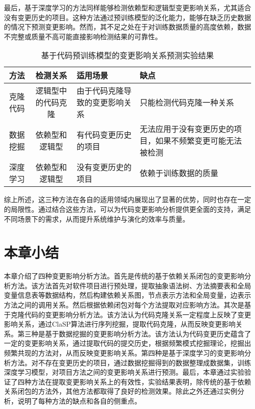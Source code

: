 最后，基于深度学习的方法同样能够检测依赖型和逻辑型变更影响关系，尤其适合没有变更历史的项目。这种方法通过预训练模型的泛化能力，能够在缺乏历史数据的情况下预测变更影响。然而，其不足之处在于对训练数据质量的高度依赖，数据不完整或质量不高可能直接影响检测结果的可靠性。

\begin{table}[htbp]
    \caption{基于代码预训练模型的变更影响关系预测实验结果}
    \vspace{0.5em}\centering\wuhao
    \begin{tabular}{ccp{4cm}p{4cm}}
    \toprule
    方法& 检测关系 & 适用场景 & 缺点\\
    \midrule
    克隆代码 & 逻辑型中的代码克隆 & 由于代码克隆导致的变更影响关系 & 只能检测代码克隆一种关系\\
    数据挖掘  & 依赖型和逻辑型 & 有代码变更历史的项目 & 无法应用于没有变更历史的项目，如果不频繁变更可能无法被检测 \\
    深度学习  & 依赖型和逻辑型 & 没有变更历史的项目 & 依赖于训练数据的质量 \\
    \bottomrule
    \end{tabular}
    \end{table}

综上所述，这三种方法在各自的适用领域内展现出了显著的优势，同时也存在一定的局限性。通过结合这些方法，可以为代码变更影响分析提供更全面的支持，满足不同场景下的需求，从而提升系统维护与演化的效率与质量。

\section{本章小结}

本章介绍了四种变更影响分析方法。首先是传统的基于依赖关系闭包的变更影响分析方法。该方法首先对软件项目进行预处理，提取抽象语法树、方法摘要表和全局变量信息表等数据结构，然后构建依赖关系图，节点表示方法和全局变量，边表示方法之间的调用关系。然后根据依赖闭包对每个方法提取对应影响方法。其次是基于克隆代码的变更影响分析方法。该方法认为代码克隆关系一定程度上反映了变更影响关系，通过ClaSP算法进行序列挖掘，提取代码克隆，从而反映变更影响关系。第三种是基于数据挖掘的变更影响分析方法。该方法认为代码变更历史蕴含了一定的变更影响关系，通过提取代码的提交历史，根据频繁模式挖掘理论，挖掘出频繁共现的方法对，从而反映变更影响关系。第四种是基于深度学习的变更影响分析方法。对不存在变更历史的项目，通过数据挖掘得到的数据整理成数据集，训练深度学习模型，对项目方法之间的变更影响关系进行预测。最后，本章通过实验验证了四种方法在提取变更影响关系上的有效性，实验结果表明，除传统的基于依赖关系闭包的方法外，其他方法都取得了良好的检测效果。除此之外还通过实例分析，说明了每种方法的缺点和各自的侧重点。


